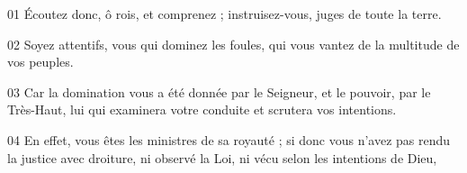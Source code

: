 01 Écoutez donc, ô rois, et comprenez ; instruisez-vous, juges de toute la terre.

02 Soyez attentifs, vous qui dominez les foules, qui vous vantez de la multitude de vos peuples.

03 Car la domination vous a été donnée par le Seigneur, et le pouvoir, par le Très-Haut, lui qui examinera votre conduite et scrutera vos intentions.

04 En effet, vous êtes les ministres de sa royauté ; si donc vous n’avez pas rendu la justice avec droiture, ni observé la Loi, ni vécu selon les intentions de Dieu,

